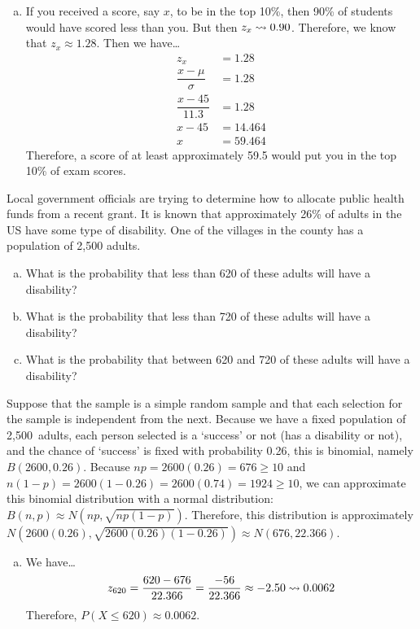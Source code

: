 \documentclass[12pt,letterpaper]{exam}
\begin{document}
\begin{questions}
{\begin{enumerate}[(a)]
\item If you received a score, say $x$, to be in the top 10\%, then 90\% of students would have scored less than you. But then $z_x \rightsquigarrow 0.90$. Therefore, we know that $z_x \approx 1.28$. Then we have\dots
	\[
	\begin{aligned}
	z_x&= 1.28 \\[0.3cm]
	\dfrac{x - \mu}{\sigma}&= 1.28 \\[0.3cm]
	\dfrac{x - 45}{11.3}&= 1.28 \\[0.3cm]
	x - 45&= 14.464 \\[0.3cm]
	x&= 59.464
	\end{aligned}
	\]
Therefore, a score of at least approximately 59.5 would put you in the top 10\% of exam scores. 
\end{enumerate}
}



\newpage
\question[10] Local government officials are trying to determine how to allocate public health funds from a recent grant. It is known that approximately 26\% of adults in the US have some type of disability. One of the villages in the county has a population of 2,500 adults.
	\begin{enumerate}[(a)]
	\item What is the probability that less than 620 of these adults will have a disability?
	\item What is the probability that less than 720 of these adults will have a disability?
	\item What is the probability that between 620 and 720 of these adults will have a disability?
	\end{enumerate} \pspace

\sol Suppose that the sample is a simple random sample and that each selection for the sample is independent from the next. Because we have a fixed population of 2,500~adults, each person selected is a `success' or not (has a disability or not), and the chance of `success' is fixed with probability 0.26, this is binomial, namely $B(2600, 0.26)$. Because $np= 2600(0.26)= 676 \geq 10$ and $n(1 - p)= 2600(1 - 0.26)= 2600(0.74)= 1924 \geq 10$, we can approximate this binomial distribution with a normal distribution: $B(n, p) \approx N(np, \sqrt{np(1 - p)})$. Therefore, this distribution is approximately $N(2600(0.26), \sqrt{2600(0.26)(1 - 0.26)}) \approx N(676, 22.366)$. 

\begin{enumerate}[(a)]
\item We have\dots
	\[
	z_{620}= \dfrac{620 - 676}{22.366}= \dfrac{-56}{22.366} \approx -2.50 \rightsquigarrow 0.0062
	\]
Therefore, $P(X \leq 620) \approx 0.0062$. \pspace


\end{enumerate}
\end{questions}
\end{document}
